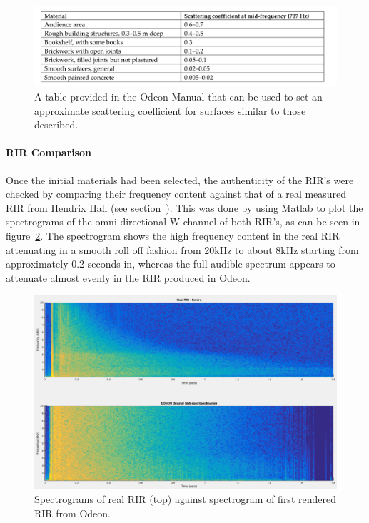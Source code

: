 \documentclass[../../main.tex]{subfiles}
\begin{document}
			\begin{figure}[H]
				\centerline{\includegraphics[scale = 0.3]{Sections/Implementation/Odeon/images/scatteringCoefficients.png}}
				\caption{A table provided in the Odeon Manual \cite{odeonManual} that can be used to set an approximate scattering coefficient for surfaces similar to those described.}
				\label{odeonTable}
			\end{figure}
		
		\paragraph{RIR Comparison}
			\label{rirComparison}

			Once the initial materials had been selected, the authenticity of the \ac{RIR}'s were checked by comparing their frequency content against that of a real measured \ac{RIR} from Hendrix Hall (see section~). This was done by using Matlab to plot the spectrograms of the omni-directional W channel of both \ac{RIR}'s, as can be seen in figure~\ref{compareOriginal}. The spectrogram shows the high frequency content in the real \ac{RIR} attenuating in a smooth roll off fashion from 20kHz to about 8kHz starting from approximately 0.2 seconds in, whereas the full audible spectrum appears to attenuate almost evenly in the \ac{RIR} produced in Odeon.

			\begin{figure}[H]
				\centerline{\includegraphics[scale = 0.3]{Sections/Implementation/Odeon/images/MaterialCompare/OriginalMaterials/original.png}}
				\caption{Spectrograms of real \ac{RIR} (top) against spectrogram of first rendered \ac{RIR} from Odeon.}
				\label{compareOriginal}
			\end{figure}
\end{document}

